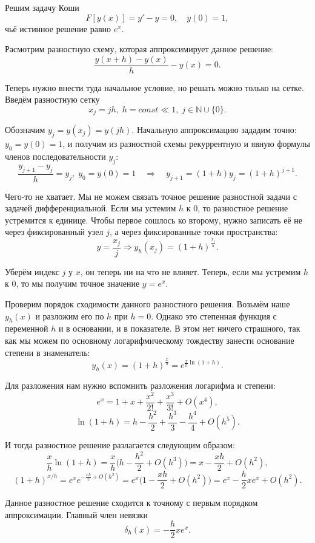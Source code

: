 \documentclass[../main.tex]{subfile}
\begin{document}
\begin{example}
\label{eq:simplest_difference_solution_example}
	Решим задачу Коши
	\[F[y(x)]=y'-y=0,\quad y(0)=1,\]
	чьё истинное решение равно $e^x$.

	Расмотрим разностную схему, которая аппроксимирует данное решение:
	\[\frac{y(x+h)-y(x)}{h}-y(x)=0.\]

	Теперь нужно внести туда начальное условие, но решать можно только
	на сетке. Введём разностную сетку
	\[x_j=jh,\;h=const\ll 1,\;j\in\mathbb N\cup\{0\}.\]

	Обозначим $y_j=y(x_j)=y(jh)$. Начальную аппроксимацию зададим точно:
	$y_0=y(0)=1$, и получим из разностной схемы рекуррентную и явную формулы
	членов последовательности $y_j$:
	\[\frac{y_{j+1}-y_j}{h}=y_j,\;y_0=y(0)=1\quad\Rightarrow\quad y_{j+1}=
	(1+h)y_j=(1+h)^{j+1}.\]

	Чего-то не хватает. Мы не можем связать точное решение разностной задачи
	с задачей дифференциальной. Если мы устемим $h$ к 0, то разностное
	решение устремится к единице. Чтобы первое сошлось ко второму, нужно
	записать её не через фиксированный узел $j$, а через фиксированные
	точки пространства:
	\[y=\frac{x_j}{j}\Rightarrow y_h(x_j)=(1+h)^\frac{x_j}{h}.\]

	Уберём индекс $j$ у $x$, он теперь ни на что не влияет. Теперь, если мы
	устремим $h$ к 0, то мы получим точное значение $y=e^x$.

	Проверим порядок сходимости данного разностного решения. Возьмём наше
	$y_h(x)$ и разложим его по $h$ при $h=0$. Однако это степенная функция
	с переменной $h$ и в основании, и в показателе. В этом нет ничего
	страшного, так как мы можем по основному логарифмическому тождеству
	занести основание степени в знаменатель:
	\[y_h(x)=(1+h)^\frac{x}{h}=e^{\frac{x}{h}\ln(1+h)}.\]

	Для разложения нам нужно вспомнить разложения логарифма и степени:
	\[e^x=1+x+\frac{x^2}{2!}+\frac{x^3}{3!}+O(x^4),\]
	\[\ln(1+h)=h-\frac{h^2}{2}+\frac{h^3}{3}-\frac{h^4}{4}+O(h^5).\]

	И тогда разностное решение разлагается следующим образом:
	\[\frac{x}{h}\ln(1+h)=\frac{x}{h}\big(h-\frac{h^2}{2}
	+O(h^3)\big)=x-\frac{xh}{2}+O(h^2),\]
	\[(1+h)^{x/h}=e^xe^{-\frac{xh}{2}+O(h^2)}=e^x\big(1-\frac{xh}{2}+
	O(h^2)\big)=e^x-\frac{h}{2}xe^x+O(h^2).\]

	Данное разностное решение сходится к точному с первым порядком
	аппроксимации. Главный член невязки
	\[\delta_h(x)=-\frac{h}{2}xe^x.\]
\end{example}
\end{document}
